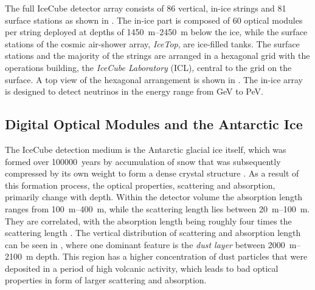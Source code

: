 The full IceCube detector array consists of 86 vertical, in-ice strings and 81 surface stations as shown in . The in-ice part is composed of 60 optical modules per string deployed at depths of \SIrange[range-phrase={~-~}]{1450}{2450}{\meter} below the ice, while the surface stations of the cosmic air-shower array, \textit{IceTop}, are ice-filled tanks. The surface stations and the majority of the strings are arranged in a hexagonal grid with the operations building, the \textit{IceCube Laboratory} (ICL), central to the grid on the surface. A top view of the hexagonal arrangement is shown in . The in-ice array is designed to detect neutrinos in the energy range from \si{\giga\electronvolt} to \si{\peta\electronvolt}.


\subsection{Digital Optical Modules and the Antarctic Ice} 

The IceCube detection medium is the Antarctic glacial ice itself, which was formed over \SI{100000}{years} by accumulation of snow that was subsequently compressed by its own weight to form a dense crystal structure . As a result of this formation process, the optical properties, scattering and absorption, primarily change with depth. Within the detector volume the absorption length ranges from \SIrange[range-phrase={~-~}]{100}{400}{\meter}, while the scattering length lies between \SIrange[range-phrase={~and~}]{20}{100}{\meter}. They are correlated, with the absorption length being roughly four times the scattering length . The vertical distribution of scattering and absorption length can be seen in , where one dominant feature is the \textit{dust layer} between \SIrange[range-phrase={~and~}]{2000}{2100}{\meter} depth. This region has a higher concentration of dust particles that were deposited in a period of high volcanic activity, which leads to bad optical properties in form of larger scattering and absorption.


